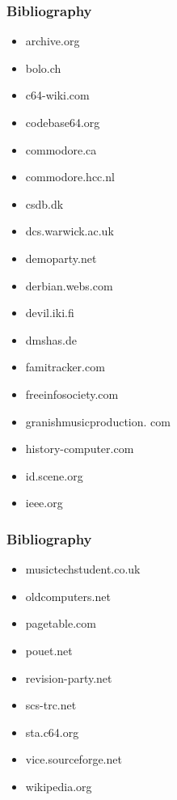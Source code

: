
\begin{frame}[noframenumbering]
\frametitle{Bibliography}

\begin{multicols}{2}
\begin{itemize}
\item archive.org
\item bolo.ch
\item c64-wiki.com
\item codebase64.org
\item commodore.ca
\item commodore.hcc.nl
\item csdb.dk
\item dcs.warwick.ac.uk
\item demoparty.net
\item derbian.webs.com
\item devil.iki.fi
\item dmshas.de
\item famitracker.com
\item freeinfosociety.com
\item granishmusicproduction. com
\item history-computer.com
\item id.scene.org
\item ieee.org
\end{itemize}
\end{multicols}

\end{frame}


\begin{frame}[noframenumbering]
\frametitle{Bibliography}

\begin{multicols}{2}
\begin{itemize}
\item musictechstudent.co.uk
\item oldcomputers.net
\item pagetable.com
\item pouet.net
\item revision-party.net
\item scs-trc.net
\item sta.c64.org
\item vice.sourceforge.net
\item wikipedia.org
\end{itemize}
\end{multicols}

\end{frame}

